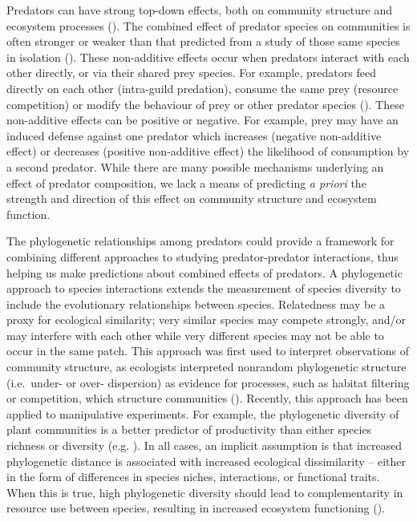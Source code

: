 \documentclass[11pt]{article}
\begin{document}


Predators can have strong top-down effects, both on community structure
and ecosystem processes (\citealt{Estes2011}). The combined effect of
predator species on communities is often stronger or weaker than that
predicted from a study of those same species in isolation
(\citealt{Sih1998a, Ives2005}). These non-additive effects occur when
predators interact with each other directly, or via their shared prey
species. For example, predators feed directly on each other (intra-guild
predation), consume the same prey (resource competition) or modify the
behaviour of prey or other predator species
(\citealt{Sih1998a, Griswold2006, Nystrom2001}). These non-additive effects
can be positive or negative. For example, prey may have an induced
defense against one predator which increases (negative non-additive
effect) or decreases (positive non-additive effect) the likelihood of
consumption by a second predator. While there are many possible
mechanisms underlying an effect of predator composition, we lack a
means of predicting \emph{a priori} the strength and direction of this
effect on community structure and ecosystem function.

The phylogenetic relationships among predators could provide a framework for combining different approaches to studying predator-predator interactions, thus helping us make
predictions about combined effects of predators. A phylogenetic approach to species interactions
extends the measurement of species diversity to include the evolutionary
relationships between species. Relatedness may be a proxy for ecological similarity; very
similar species may compete strongly, and/or may interfere with each
other while very different species may not be able to occur in the same
patch. This approach was first used to interpret observations of
community structure, as ecologists interpreted nonrandom phylogenetic
structure (i.e.~under- or over- dispersion) as evidence for
processes, such as habitat filtering or competition, which structure
communities (\citealt{Webb2002, Cavender-Bares2009}). Recently, this
approach has been applied to manipulative experiments. For example, the
phylogenetic diversity of plant communities is a better predictor of
productivity than either species richness or diversity
(e.g. \citealt{Cadotte2009, Cadotte2008, Godoy2014}). In all cases, an
implicit assumption is that increased phylogenetic distance is
associated with increased ecological dissimilarity -- either in the form
of differences in species niches, interactions, or functional traits.
When this is true, high phylogenetic diversity should lead to
complementarity in resource use between species, resulting in increased
ecosystem functioning (\citealt{Srivastava2012c}). 
\end{document}

